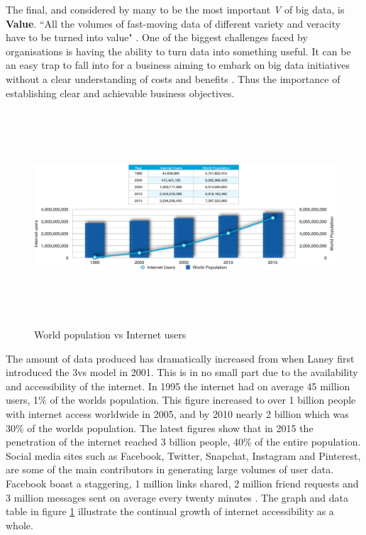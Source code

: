 The final, and considered by many to be the most important \textit{V} of big data, is \textbf{Value}. ``All the volumes of fast-moving data of different variety and veracity have to be turned into value" \cite{ibm}. One of the biggest challenges faced by organisations is having the ability to turn data into something useful. It can be an easy trap to fall into for a business aiming to embark on big data initiatives without a clear understanding of costs and benefits \cite{bigdata}. Thus the importance of establishing clear and achievable business objectives.

\begin{figure}[h]\begin{center}\includegraphics[height = 8cm,width=1\linewidth]{images/worldpopgraph}\caption{World population vs Internet users}\label{fig:worldpop}\end{center}\end{figure}
The amount of data produced has dramatically increased from when Laney first introduced the 3vs model in 2001. This is in no small part due to the availability and accessibility of the internet. In 1995 the internet had on average 45 million users, 1\% of the worlds population. This figure increased to over 1 billion people with internet access worldwide in 2005, and by 2010 nearly 2 billion which was 30\% of the worlds population. The latest figures show that in 2015 the penetration of the internet reached 3 billion people, 40\% of the entire population. Social media sites such as Facebook, Twitter, Snapchat, Instagram and Pinterest, are some of the main contributors in generating large volumes of user data. Facebook boast a staggering, 1 million links shared, 2 million friend requests and 3 million messages sent on average every twenty minutes \cite{statref}. The graph and data table in figure \ref{fig:worldpop} illustrate the continual growth of internet accessibility as a whole.

